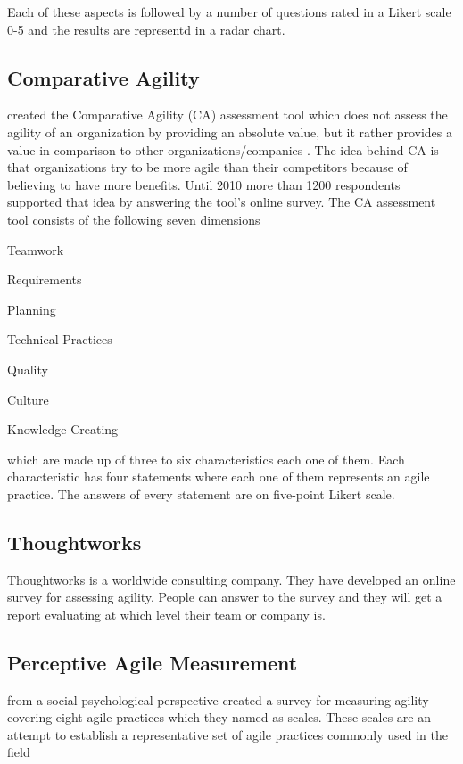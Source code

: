 Each of these aspects is followed by a number of questions rated in a Likert scale 0-5 and the results are representd in a radar chart.

\subsection{Comparative Agility} %
\citet{comparative_agility} created the Comparative Agility (CA) assessment tool which does not assess the agility of an organization by providing an absolute value, but it rather provides a value in comparison to other organizations/companies \cite{comparative_agility_web}. The idea behind CA is that organizations try to be more agile than their competitors because of believing to have more benefits. Until 2010 more than 1200 respondents supported that idea by answering the tool's online survey. The CA assessment tool consists of the following seven dimensions 
\begin{inparaenum} [a\upshape)]
	\item Teamwork
	\item Requirements
	\item Planning
	\item Technical Practices
	\item Quality
	\item Culture
	\item Knowledge-Creating
\end{inparaenum}
which are made up of three to six characteristics each one of them. Each characteristic has four statements where each one of them represents an agile practice. The answers of every statement are on five-point Likert scale.

\subsection{Thoughtworks} %
Thoughtworks \cite{thoughtworks} is a worldwide consulting company. They have developed an online survey for assessing agility. People can answer to the survey and they will get a report evaluating at which level their team or company is.

\subsection{Perceptive Agile Measurement}
\citet{pam} from a social-psychological perspective created a survey for measuring agility covering eight agile practices which they named as scales. These scales are an attempt to establish a representative set of agile practices commonly used in the field


